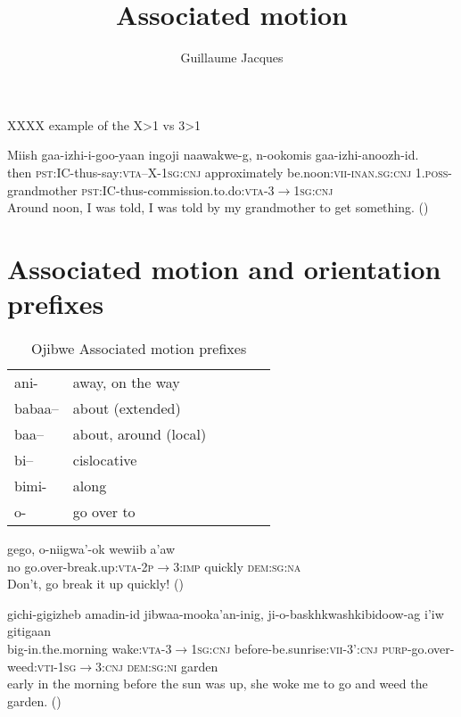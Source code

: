 \documentclass[oldfontcommands,oneside,a4paper,11pt]{article}
\begin{document}
 
 \title{Associated motion} 
\author{Guillaume Jacques}
\maketitle
\linenumbers
\sloppy
XXXX example of the X>1 vs 3>1
\begin{exe}
\ex 
\gll Miish gaa-izhi-i-goo-yaan ingoji naawakwe-g, n-ookomis gaa-izhi-anoozh-id. \\
then \textsc{pst}:IC-thus-say:\textsc{vta}--X-\textsc{1sg:cnj} approximately be.noon:\textsc{vii}-\textsc{inan.sg:cnj} \textsc{1.poss}-grandmother  \textsc{pst}:IC-thus-commission.to.do:\textsc{vta}-3$\rightarrow$\textsc{1sg:cnj} \\
\glt Around noon, I was told, I was told by my grandmother to get something. (\citealt[96]{kegg93portage})
\end{exe}

\section{Associated motion and orientation prefixes}
\citet[728-734]{valentine01grammar}


\begin{table}[H]
\caption{Ojibwe Associated motion prefixes }\label{tab:ojb.am} \centering
\begin{tabular}{llllll}
\toprule
ani- &away, on the way\\
babaa--&about (extended)\\
baa-- &about, around (local)\\
bi--	&cislocative\\
bimi- &along\\
o- &go over to\\
\bottomrule
\end{tabular}
\end{table}

\citet{kegg93portage}

\begin{exe}
\ex 
\gll
gego, o-niigwa'-ok wewiib a'aw \\
no go.over-break.up:\textsc{vta}-\textsc{2p$\rightarrow$3:imp} quickly \textsc{dem:sg:na} \\
\glt Don't, go break it up quickly! (\citealt[150]{kegg93portage})
\end{exe}

\begin{exe}
\ex 
\gll
gichi-gigizheb amadin-id jibwaa-mooka'an-inig, ji-o-baskhkwashkibidoow-ag i'iw gitigaan \\
big-in.the.morning wake:\textsc{vta}-3$\rightarrow$\textsc{1sg}:\textsc{cnj} before-be.sunrise:\textsc{vii}-3':\textsc{cnj}
\textsc{purp}-go.over-weed:\textsc{vti}-\textsc{1sg}$\rightarrow$3:\textsc{cnj} \textsc{dem:sg:ni} garden \\
\glt early in the morning before the sun was up, she woke me to go and weed the garden. (\citealt[42]{kegg93portage})
\end{exe}
\end{document}
